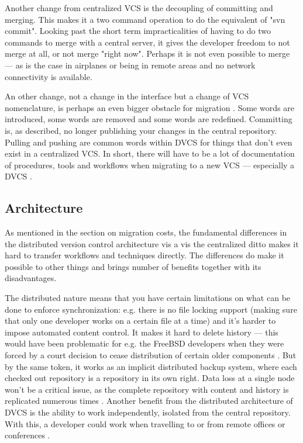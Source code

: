\documentclass{llncs}
\begin{document}
Another change from centralized VCS is the decoupling of committing
and merging. This makes it a two command operation to do the
equivalent of "svn commit". Looking past the short term
impracticalities of having to do two commands to merge with a central
server, it gives the developer freedom to not merge at all, or not
merge "right now". Perhaps it is not even possible to merge --- as is
the case in airplanes or being in remote areas and no network
connectivity is available.

An other change, not a change in the interface but a change of VCS
nomenclature, is perhaps an even bigger obstacle for migration
\cite{bird09}. Some words are introduced, some words are removed and
some words are redefined. Committing is, as described, no longer
publishing your changes in the central repository. Pulling and pushing
are common words within DVCS for things that don't even exist in a
centralized VCS. In short, there will have to be a lot of
documentation of procedures, tools and workflows when migrating to a
new VCS --- especially a DVCS \cite{alwis09}.

\subsection{Architecture}

As mentioned in the section on migration costs, the fundamental
differences in the distributed version control architecture vis a vis 
the centralized ditto makes it hard to transfer workflows and
techniques directly. The differences do make it possible to other
things and brings number of benefits together with its disadvantages.

The distributed nature means that you have certain limitations on what
can be done to enforce synchronization: e.g. there is no file locking
support (making sure that only one developer works on a certain file
at a time) \cite{osullivan09} and it's harder to impose automated
content control. It makes it hard to delete history --- this would
have been problematic for e.g. the FreeBSD developers when they were
forced by a court decision to cease distribution of certain older
components \cite{alwis09}. But by the same token, it works as an
implicit distributed backup system, where each checked out repository
is a repository in its own right. Data loss at a single node won't be
a critical issue, as the complete repository with content and history
is replicated numerous times \cite{alwis09}. Another benefit from the
distributed architecture of DVCS is the ability to work independently,
isolated from the central repository. With this, a developer could
work when travelling to or from remote offices or conferences
\cite{alwis09}\cite{robert06}.
\end{document}
